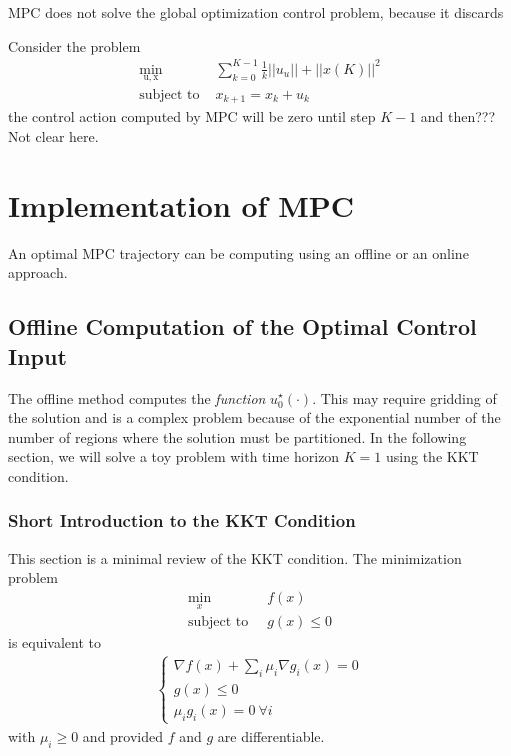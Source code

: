 \documentclass[11pt]{report}
\newcommand{\bs}[1]{\boldsymbol{#1}}
\newcommand{\bsu}{\bs{\mathrm{u}}}
\newcommand{\bsx}{\bs{\mathrm{x}}}
\begin{document}
MPC does not solve the global optimization control problem, because it
discards

Consider the problem
\begin{align*}
  \min_{\bsu,\bsx} & \sum_{k=0}^{K-1}\frac {1}{k}||u_u|| + ||x(K)||^2\\
  \text{subject to } &x_{k+1} = x_k+u_k
\end{align*}
the control action computed by MPC will be zero until step $K-1$ and
then??? Not clear here.


\section{Implementation of MPC}
\label{sec:implementation-MPC}

An optimal MPC trajectory can be computing using an offline or an online approach.

\subsection{Offline Computation of the Optimal Control Input}
\label{sec:offline-computation-MPC}

The offline method computes the \emph{function} $u_0^\star(\cdot)$. This may require gridding of the solution and is a complex problem because of the exponential number of the number of regions where the solution must be partitioned. In the following section, we will solve a toy problem with time horizon $K=1$ using the KKT condition.

\subsubsection{Short Introduction to the KKT Condition}
\label{sec:short-intro-KKT}

This section is a minimal review of the KKT condition. The minimization problem
\begin{align*}
  \min_x &\ f(x) \\
  \text{subject to } &\ g(x) \le 0
\end{align*}
is equivalent to
\begin{align*}
  \begin{cases}
    \nabla f(x) + \sum_i \mu_i \nabla g_i(x) = 0 \\
    g(x) \le 0 \\
    \mu_i g_i(x) = 0\ \forall i
  \end{cases}
\end{align*}
with $\mu_i\ge 0$ and provided $f$ and $g$ are differentiable.
\end{document}
